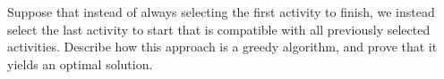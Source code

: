 Suppose that instead of always selecting the first activity to finish, 
we instead select the last activity to start that is compatible with 
all previously selected activities. Describe how this approach is a 
greedy algorithm, and prove that it yields an optimal solution.